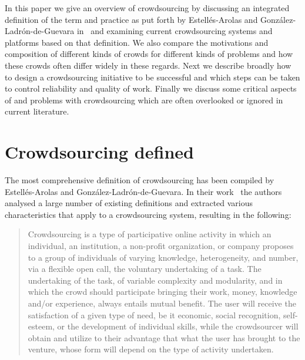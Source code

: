 \documentclass{sig-alternate}
\begin{document}
In this paper we give an overview of crowdsourcing by discussing an integrated
definition of the term and practice as put forth by Estell{\'e}s-Arolas and
Gonz{\'a}lez-Ladr{\'o}n-de-Guevara in~\cite{estelles2012towards} and examining
current crowdsourcing systems and platforms based on that definition. We also
compare the motivations and composition of different kinds of crowds for
different kinds of problems and how these crowds often differ widely in these
regards. Next we describe broadly how to design a crowdsourcing initiative to be
successful and which steps can be taken to control reliability and quality of
work. Finally we discuss some critical aspects of and problems with
crowdsourcing which are often overlooked or ignored in current literature. 


\section{Crowdsourcing defined}\label{csdef}

The most comprehensive definition of crowdsourcing has been compiled by
Estell{\'e}s-Arolas and Gonz{\'a}lez-Ladr{\'o}n-de-Guevara. In their
work~\cite{estelles2012towards} the authors analysed a large number of
existing definitions and extracted various characteristics that apply to a
crowdsourcing system, resulting in the following: 
\begin{quotation}
	Crowdsourcing is a type of participative online activity in which an
	individual, an institution, a non-profit organization, or company proposes to
	a group of individuals of varying knowledge, heterogeneity, and number, via a
	flexible open call, the voluntary undertaking of a task. The undertaking of
	the task, of variable complexity and modularity, and in which the crowd should
	participate bringing their work, money, knowledge and/or experience, always
	entails mutual benefit. The user will receive the satisfaction of a given type
	of need, be it economic, social recognition, self-esteem, or the development
	of individual skills, while the crowdsourcer will obtain and utilize to their
	advantage that what the user has brought to the venture, whose form will
	depend on the type of activity undertaken.
\end{quotation}
\end{document}
